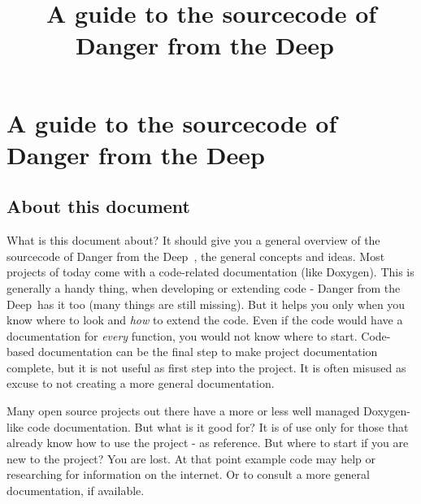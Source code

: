 \documentclass{report}
\begin{document}
\tableofcontents

\newcommand{\dftd}{\textsf{Danger from the Deep}\ }



\title{A guide to the sourcecode of \dftd}

\chapter{A guide to the sourcecode of \dftd}

\section{About this document}

What is this document about? It should give you a general overview of
the sourcecode of \dftd, the general concepts and ideas. Most projects
of today come with a code-related documentation (like Doxygen). This is
generally a handy thing, when developing or extending code - \dftd has
it too (many things are still missing). But it helps you only when you
know where to look and \emph{how} to extend the code.  Even if the code
would have a documentation for \emph{every} function, you would not know
where to start. Code-based documentation can be the final step to make
project documentation complete, but it is not useful as first step into
the project. It is often misused as excuse to not creating a more
general documentation.

Many open source projects out there have a more or less well managed
Doxygen-like code documentation. But what is it good for? It is of use
only for those that already know how to use the project - as reference.
But where to start if you are new to the project? You are lost. At that
point example code may help or researching for information on the
internet. Or to consult a more general documentation, if available.
\end{document}
